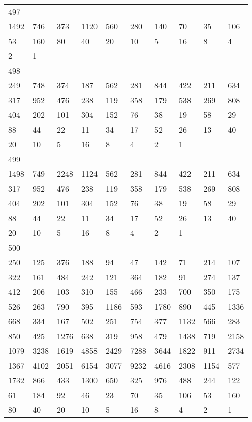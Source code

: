 \begin{longtable}{*{10}{l}}
497&&&&&&&&&\\
1492& 746& 373& 1120& 560& 280& 140& 70& 35& 106\\
53& 160& 80& 40& 20& 10& 5& 16& 8& 4\\
2& 1& \\

498&&&&&&&&&\\
249& 748& 374& 187& 562& 281& 844& 422& 211& 634\\
317& 952& 476& 238& 119& 358& 179& 538& 269& 808\\
404& 202& 101& 304& 152& 76& 38& 19& 58& 29\\
88& 44& 22& 11& 34& 17& 52& 26& 13& 40\\
20& 10& 5& 16& 8& 4& 2& 1& \\

499&&&&&&&&&\\
1498& 749& 2248& 1124& 562& 281& 844& 422& 211& 634\\
317& 952& 476& 238& 119& 358& 179& 538& 269& 808\\
404& 202& 101& 304& 152& 76& 38& 19& 58& 29\\
88& 44& 22& 11& 34& 17& 52& 26& 13& 40\\
20& 10& 5& 16& 8& 4& 2& 1& \\

500&&&&&&&&&\\
250& 125& 376& 188& 94& 47& 142& 71& 214& 107\\
322& 161& 484& 242& 121& 364& 182& 91& 274& 137\\
412& 206& 103& 310& 155& 466& 233& 700& 350& 175\\
526& 263& 790& 395& 1186& 593& 1780& 890& 445& 1336\\
668& 334& 167& 502& 251& 754& 377& 1132& 566& 283\\
850& 425& 1276& 638& 319& 958& 479& 1438& 719& 2158\\
1079& 3238& 1619& 4858& 2429& 7288& 3644& 1822& 911& 2734\\
1367& 4102& 2051& 6154& 3077& 9232& 4616& 2308& 1154& 577\\
1732& 866& 433& 1300& 650& 325& 976& 488& 244& 122\\
61& 184& 92& 46& 23& 70& 35& 106& 53& 160\\
80& 40& 20& 10& 5& 16& 8& 4& 2& 1\\


\end{longtable}
